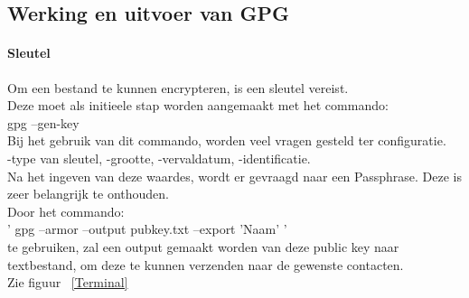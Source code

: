 \documentclass[12pt]{article}
\begin{document}
			\newpage		
			\subsection{Werking en uitvoer van GPG}\label{Werk}	
				\paragraph*{Sleutel}
				Om een bestand te kunnen encrypteren, is een sleutel vereist.\\
				Deze moet als initieele stap worden aangemaakt met het commando:\\
				gpg --gen-key\\
				Bij het gebruik van dit commando, worden veel vragen gesteld ter configuratie.\\
				-type van sleutel, -grootte, -vervaldatum, -identificatie.\\
				Na het ingeven van deze waardes, wordt er gevraagd naar een Passphrase.
				Deze is zeer belangrijk te onthouden.\\
				Door het commando:\\
				' gpg --armor --output pubkey.txt --export 'Naam' '\\
				te gebruiken, zal een output gemaakt worden van deze public key naar textbestand,
				om deze te kunnen verzenden naar de gewenste contacten.\\
				Zie figuur ~\ref{Terminal}\\
				
\end{document}
